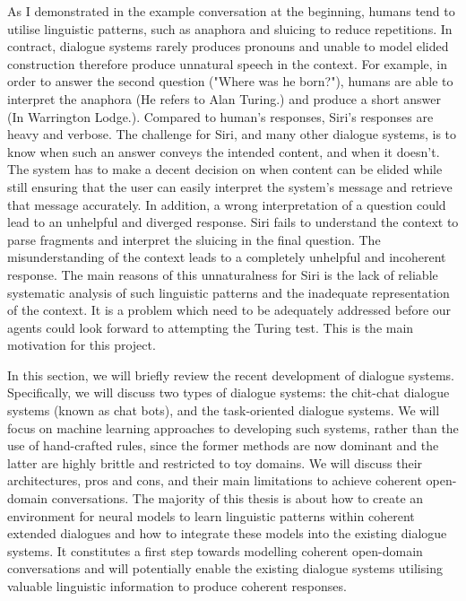 \documentclass[bsc,frontabs,twoside,singlespacing,parskip,deptreport]{infthesis}     %
\begin{document}
As I demonstrated in the example conversation at the beginning, humans tend to utilise linguistic patterns, such as anaphora and sluicing to reduce repetitions. In contract, dialogue systems rarely produces pronouns and unable to model elided construction therefore produce unnatural speech in the context. For example, in order to answer the second question ("Where was he born?"), humans are able to interpret the anaphora (He refers to Alan Turing.) and produce a short answer (In Warrington Lodge.). Compared to human's responses, Siri's responses are heavy and verbose. The challenge for Siri, and many other dialogue systems, is to know when such an answer conveys the intended content, and when it doesn't. The system has to make a decent decision on when content can be elided while still ensuring that the user can easily interpret the system's message and retrieve that message accurately. In addition, a wrong interpretation of a question could lead to an unhelpful and diverged response. Siri fails to understand the context to parse fragments and interpret the sluicing in the final question. The misunderstanding of the context leads to a completely unhelpful and incoherent response. The main reasons of this unnaturalness for Siri is the lack of reliable systematic analysis of such linguistic patterns and the inadequate representation of the context. It is a problem which need to be adequately addressed before our agents could look forward to attempting the Turing test. This is the main motivation for this project.

In this section, we will briefly review the recent development of dialogue systems. Specifically, we will discuss two types of dialogue systems: the chit-chat dialogue systems (known as chat bots), and the task-oriented dialogue systems.  We will focus on machine learning approaches to developing such systems, rather than the use of hand-crafted rules, since the former methods are now dominant and the latter are highly brittle and restricted to toy domains. We will discuss their architectures, pros and cons, and their main limitations to achieve coherent open-domain conversations. The majority of this thesis is about how to create an environment for neural models to learn linguistic patterns within coherent extended dialogues and how to integrate these models into the existing dialogue systems. It constitutes a first step towards modelling coherent open-domain conversations and will potentially enable the existing dialogue systems utilising valuable linguistic information to produce coherent responses.
\end{document}
